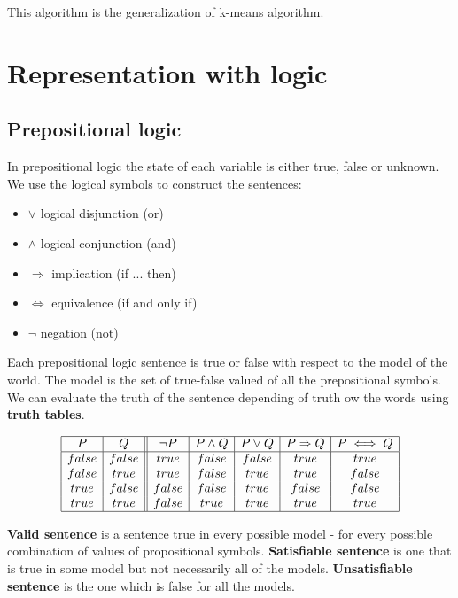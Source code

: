 \documentclass[a4paper,10pt]{article}
\begin{document}
This algorithm is the generalization of k-means algorithm.


\section{Representation with logic}

\subsection{Prepositional logic}	

In prepositional logic the state of each variable is either true, false or unknown. 
We use the logical symbols to construct the sentences:
\begin{itemize}
\setlength{\itemsep}{0pt}
\setlength{\parskip}{0pt}
\setlength{\parsep}{0pt}
\item $\lor$ logical disjunction (or)
\item $\land$ logical conjunction (and)
\item $\Rightarrow$ implication (if ... then)
\item $\iff$ equivalence (if and only if)
\item $\lnot$ negation (not)
\end{itemize}
Each prepositional logic sentence is true or false with respect to the model of the world. The model is the set of true-false valued of all the prepositional symbols. We can evaluate the truth of the sentence depending of truth ow the words using \textbf{truth tables}.

\begin{displaymath}
\begin{array}{|c|c||c|c|c|c|c|}
\hline
   P & Q & \lnot{}P & P\land{}Q & P\lor{}Q & P\Rightarrow{}Q & P\iff{}Q \\
\hline
false & false & true & false & false & true & true \\
false & true & true & false & true & true & false \\
true & false & false & false & true & false & false \\
true & true & false & true & true & true & true \\
\hline
\end{array}
\end{displaymath}

\textbf{Valid sentence} is a sentence true in every possible model - for every possible combination of values of propositional symbols. \textbf{Satisfiable sentence} is one that is true in some model but not necessarily all of the models. \textbf{Unsatisfiable sentence} is the one which is false for all the models.
\end{document}
